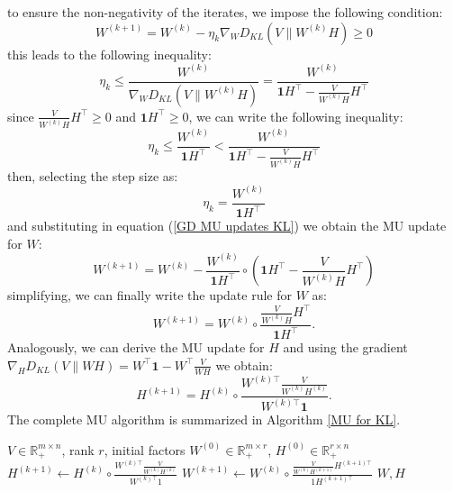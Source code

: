 to ensure the non-negativity of the iterates, we impose the following condition:
\begin{equation}
    W^{(k+1)} = W^{(k)} - \eta_k \nabla_W D_{KL}(V \| W^{(k)}H) \geq 0
\end{equation}
this leads to the following inequality:
\begin{equation}
    \eta_k \leq \frac{W^{(k)}}{\nabla_W D_{KL}(V \| W^{(k)}H)} = \frac{W^{(k)}}{\textbf{1} H^\top - \frac{V}{W^{(k)}H} H^\top}
\end{equation}
since $\frac{V}{W^{(k)}H} H^\top \geq 0$ and $\textbf{1} H^\top \geq 0$, we can write the following inequality:
\begin{equation}
    \eta_k \leq \frac{W^{(k)}}{\textbf{1} H^\top} < \frac{W^{(k)}}{\textbf{1} H^\top - \frac{V}{W^{(k)}H} H^\top}
\end{equation}
then, selecting the step size as:
\begin{equation}
    \eta_k = \frac{W^{(k)}}{\textbf{1} H^\top}
\end{equation}
and substituting in equation (\ref{GD MU updates KL}) we obtain the MU update for \( W \):
\begin{equation}
    W^{(k+1)} = W^{(k)} - \frac{W^{(k)}}{\textbf{1} H^\top} \circ (\textbf{1} H^\top - \frac{V}{W^{(k)}H} H^\top)
\end{equation}
simplifying, we can finally write the update rule for \( W \) as:
\begin{equation}
    \boxed{W^{(k+1)} = W^{(k)} \circ \frac{\frac{V}{W^{(k)}H} H^\top}{\textbf{1} H^\top}.}
\end{equation}
Analogously, we can derive the MU update for \( H \) and using the gradient $\nabla_H D_{KL}(V \| WH) = W^\top \textbf{1} - W^\top \frac{V}{WH}$ we obtain:
\begin{equation}
    \boxed{H^{(k+1)} = H^{(k)} \circ \frac{W^{(k) \top} \frac{V}{W^{(k)} H^{(k)}}}{W^{(k) \top} \textbf{1}}.}
\end{equation}
The complete MU algorithm is summarized in Algorithm \ref{MU for KL}.
\begin{algorithm}
    \caption{Multiplicative Updates for NMF with the Kullback-Leibler divergence}
    \label{MU for KL}
    \begin{algorithmic}[1]
        \Require \( V \in \mathbb{R}_+^{m \times n} \), rank \( r \), initial factors \( W^{(0)} \in \mathbb{R}_+^{m \times r} \), \( H^{(0)} \in \mathbb{R}_+^{r \times n} \)
            \State \( H^{(k+1)} \leftarrow H^{(k)} \circ \frac{W^{(k) \top} \frac{V}{W^{(k)} H^{(k)}}}{W^{(k) \top} 1} \)
            \State \( W^{(k+1)} \leftarrow W^{(k)} \circ \frac{\frac{V}{W^{(k)} H^{(k+1)}} H^{(k+1) \top}}{1 H^{(k+1) \top}} \)
        \EndWhile
        \State \Return \( W, H \)
    \end{algorithmic}
\end{algorithm}
